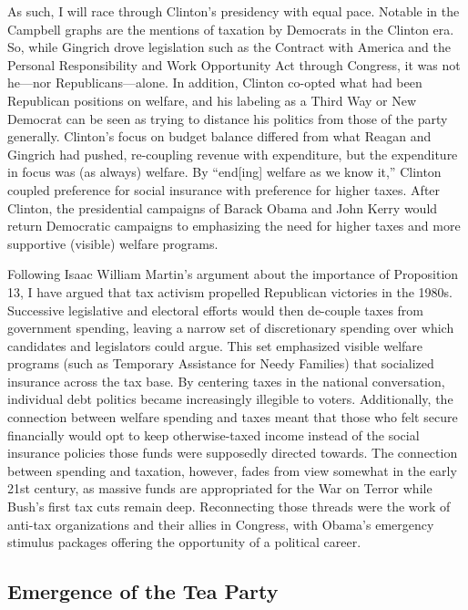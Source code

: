 \documentclass[12pt,oneside]{psthesis}
\begin{document}
As such, I will race through Clinton's presidency with equal pace.
Notable in the Campbell graphs are the mentions of taxation by Democrats in the Clinton era.
So, while Gingrich drove legislation such as the Contract with America and the Personal Responsibility and Work Opportunity Act through Congress, it was not he---nor Republicans---alone.
In addition, Clinton co-opted what had been Republican positions on welfare, and his labeling as a Third Way or New Democrat can be seen as trying to distance his politics from those of the party generally.
Clinton's focus on budget balance differed from what Reagan and Gingrich had pushed, re-coupling revenue with expenditure, but the expenditure in focus was (as always) welfare.
By ``end{[}ing{]} welfare as we know it,'' Clinton coupled preference for social insurance with preference for higher taxes.
After Clinton, the presidential campaigns of Barack Obama and John Kerry would return Democratic campaigns to emphasizing the need for higher taxes and more supportive (visible) welfare programs.

Following Isaac William Martin's argument about the importance of Proposition 13, I have argued that tax activism propelled Republican victories in the 1980s.
Successive legislative and electoral efforts would then de-couple taxes from government spending, leaving a narrow set of discretionary spending over which candidates and legislators could argue.
This set emphasized visible welfare programs (such as Temporary Assistance for Needy Families) that socialized insurance across the tax base.
By centering taxes in the national conversation, individual debt politics became increasingly illegible to voters.
Additionally, the connection between welfare spending and taxes meant that those who felt secure financially would opt to keep otherwise-taxed income instead of the social insurance policies those funds were supposedly directed towards.
The connection between spending and taxation, however, fades from view somewhat in the early 21st century, as massive funds are appropriated for the War on Terror while Bush's first tax cuts remain deep.
Reconnecting those threads were the work of anti-tax organizations and their allies in Congress, with Obama's emergency stimulus packages offering the opportunity of a political career.

\hypertarget{emergence-of-the-tea-party}{%
\subsection{Emergence of the Tea Party}\label{emergence-of-the-tea-party}}
\end{document}
